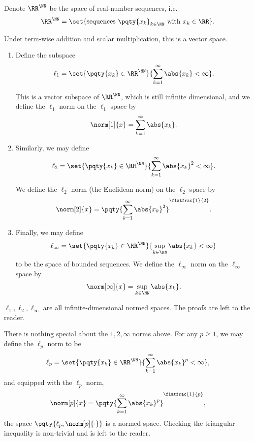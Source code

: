 \begin{example}
    Denote \(\RR^\NN\) be the space of real-number sequences, i.e.
    \[
        \RR^\NN = \set{\text{sequences }\pqty{x_k}_{k \in \NN}\text{ with }x_k \in \RR}.
    \]

    Under term-wise addition and scalar multiplication, this is a vector space.

    \begin{enumerate}
        \item Define the subspace
        \[
            \ell_1 = \set{\pqty{x_k} \in \RR^\NN}{\sum_{k = 1}^{\infty} \abs{x_k} < \infty}.
        \]

        This is a vector subspace of \(\RR^\NN\), which is still infinite dimensional, and we define the \(\ell_1\) norm on the \(\ell_1\) space by
        \[
            \norm[1]{x} = \sum_{k = 1}^{\infty} \abs{x_k}.
        \]
        \item Similarly, we may define
        \[
            \ell_2 = \set{\pqty{x_k} \in \RR^\NN}{\sum_{k = 1}^{\infty} \abs{x_k}^2 < \infty}.
        \]

        We define the \(\ell_2\) norm (the Euclidean norm) on the \(\ell_2\) space by
        \[
            \norm[2]{x} = \pqty{\sum_{k = 1}^{\infty} \abs{x_k}^2}^{\flatfrac{1}{2}}.
        \]
        \item Finally, we may define
        \[
            \ell_\infty = \set{\pqty{x_k} \in \RR^\NN}{\sup_{k \in \NN} \abs{x_k} < \infty}
        \]
        to be the space of bounded sequences. We define the \(\ell_\infty\) norm on the \(\ell_\infty\) space by
        \[
            \norm[\infty]{x} = \sup_{k \in \NN} \abs{x_k}.
        \]
    \end{enumerate}

    \(\ell_1, \ell_2, \ell_\infty\) are all infinite-dimensional normed spaces. The proofs are left to the reader.

    There is nothing special about the \(1, 2, \infty\) norms above. For any \(p \geq 1\), we may define the \(\ell_p\) norm to be
    \[
        \ell_p = \set{\pqty{x_k} \in \RR^\NN}{\sum_{k = 1}^{\infty} \abs{x_k}^p < \infty},
    \]
    and equipped with the \(\ell_p\) norm,
    \[
        \norm[p]{x} = \pqty{\sum_{k = 1}^{\infty} \abs{x_k}^p}^{\flatfrac{1}{p}},
    \]
    the space \(\pqty{\ell_p, \norm[p]{\cdot}}\) is a normed space. Checking the triangular inequality is non-trivial and is left to the reader.
\end{example}

